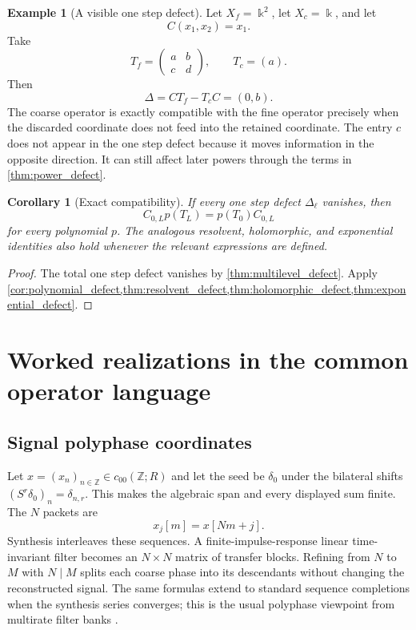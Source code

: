 \documentclass[11pt,a4paper]{article}
\newtheorem{corollary}[corollary]{Corollary}
\theoremstyle{definition}
\newtheorem{example}[example]{Example}
\theoremstyle{remark}
\newcommand{\bbk}{\Bbbk}
\providecommand{\bbk}{\mathbb{k}}
\providecommand{\Z}{\mathbb Z}
\theoremstyle{definition}\newtheorem{construction}[theorem]{Construction}\newtheorem{certificate}[theorem]{Numerical Certificate}
\theoremstyle{remark}\newtheorem{boundary}[theorem]{Boundary}
\begin{document}
\begin{example}[A visible one step defect]\label{ex:defect_example}
Let $X_f=\bbk^2$, let $X_c=\bbk$, and let
\[
C(x_1,x_2)=x_1.
\]
Take
\[
T_f=
\begin{pmatrix}
a&b\\
c&d
\end{pmatrix},
\qquad
T_c=(a).
\]
Then
\[
\Delta=CT_f-T_cC=(0,b).
\]
The coarse operator is exactly compatible with the fine operator precisely when the discarded coordinate does not feed into the retained coordinate.  The entry $c$ does not appear in the one step defect because it moves information in the opposite direction.  It can still affect later powers through the terms in \cref{thm:power_defect}.
\end{example}

\begin{corollary}[Exact compatibility]\label{cor:exact_compatibility}
If every one step defect $\Delta_\ell$ vanishes, then
\[
C_{0,L}p(T_L)=p(T_0)C_{0,L}
\]
for every polynomial $p$.  The analogous resolvent, holomorphic, and exponential identities also hold whenever the relevant expressions are defined.
\end{corollary}

\begin{proof}
The total one step defect vanishes by \cref{thm:multilevel_defect}.  Apply \cref{cor:polynomial_defect,thm:resolvent_defect,thm:holomorphic_defect,thm:exponential_defect}.
\end{proof}

\section{Worked realizations in the common operator language}

\subsection{Signal polyphase coordinates}

Let $x=(x_n)_{n\in\Z}\in c_{00}(\Z;R)$ and let the seed be $\delta_0$
under the bilateral shifts $(S^r\delta_0)_n=\delta_{n,r}$. This makes the
algebraic span and every displayed sum finite. The $N$ packets are
\[
x_j[m]=x[Nm+j].
\]
Synthesis interleaves these sequences. A finite-impulse-response linear
time-invariant filter becomes an $N\times N$ matrix of transfer blocks.
Refining from $N$ to $M$ with $N\mid M$ splits each coarse phase into its
descendants without changing the reconstructed signal. The same formulas
extend to standard sequence completions when the synthesis series converges;
this is the usual polyphase viewpoint from multirate filter banks
\cite{Vaidyanathan1993}.
\end{document}
